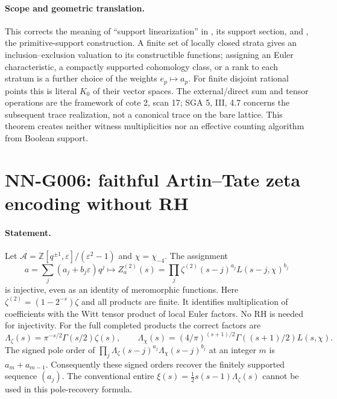 \paragraph{Scope and geometric translation.}
This corrects the meaning of ``support linearization'' in
, its support section,
and , the
primitive-support construction. A finite set of locally closed
strata gives an inclusion--exclusion valuation to its constructible
functions; assigning an Euler characteristic, a compactly supported
cohomology class, or a rank to each stratum is a further choice of
the weights $e_p\mapsto a_p$. For finite disjoint rational points
this is literal $K_0$ of their vector spaces. The external/direct
sum and tensor operations are the framework of cote 2, scan 17;
SGA 5, III, 4.7 concerns the subsequent trace realization, not a
canonical trace on the bare lattice. This theorem creates neither
witness multiplicities nor an effective counting algorithm from
Boolean support.



\section{NN-G006: faithful Artin--Tate zeta encoding without RH}
\paragraph{Statement.}
Let
$\mathcal A=\mathbb Z[q^{\pm1},\varepsilon]/(\varepsilon^2-1)$ and
$\chi=\chi_{-4}$. The assignment
\[
 a=\sum_j(a_j+b_j\varepsilon)q^j\longmapsto
 Z_a^{(2)}(s)=\prod_j\zeta^{(2)}(s-j)^{a_j}
                         L(s-j,\chi)^{b_j}                 \tag{G006.1}
\]
is injective, even as an identity of meromorphic functions. Here
$\zeta^{(2)}=(1-2^{-s})\zeta$ and all products are finite. It
identifies multiplication of coefficients with the Witt tensor
product of local Euler factors. No RH is needed for injectivity.
For the full completed products the correct factors are
\[
 \Lambda_\zeta(s)=\pi^{-s/2}\Gamma(s/2)\zeta(s),\qquad
 \Lambda_\chi(s)=(4/\pi)^{(s+1)/2}\Gamma((s+1)/2)L(s,\chi).
 \tag{G006.2}
\]
The signed pole order of
$\prod_j\Lambda_\zeta(s-j)^{a_j}\Lambda_\chi(s-j)^{b_j}$ at an
integer $m$ is $a_m+a_{m-1}$. Consequently these signed orders
recover the finitely supported sequence $(a_j)$. The conventional
entire $\xi(s)=\tfrac12s(s-1)\Lambda_\zeta(s)$ cannot be used
in this pole-recovery formula.

